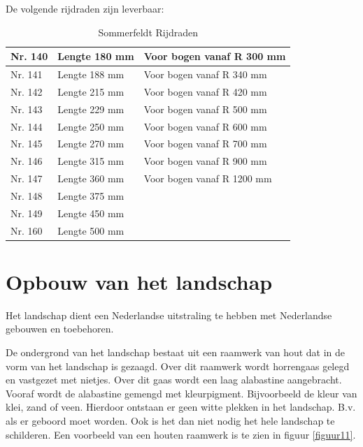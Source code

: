 \documentclass[12pt,a4paper]{report}
\begin{document}
De volgende rijdraden zijn leverbaar:

\begin{table}[h!]
\begin{tabular}{| l | l | l |}
\hline
\cellcolor[gray]{0.84}Nr. 140&Lengte 180 mm&Voor bogen vanaf R 300 mm\\
\hline
\cellcolor[gray]{0.84}Nr. 141&Lengte 188 mm&Voor bogen vanaf R 340 mm\\
\hline
\cellcolor[gray]{0.84}Nr. 142&Lengte 215 mm&Voor bogen vanaf R 420 mm\\
\hline
\cellcolor[gray]{0.84}Nr. 143&Lengte 229 mm&Voor bogen vanaf R 500 mm\\
\hline
\cellcolor[gray]{0.84}Nr. 144&Lengte 250 mm&Voor bogen vanaf R 600 mm\\
\hline
\cellcolor[gray]{0.84}Nr. 145&Lengte 270 mm&Voor bogen vanaf R 700 mm\\
\hline
\cellcolor[gray]{0.84}Nr. 146&Lengte 315 mm&Voor bogen vanaf R 900 mm\\
\hline
\cellcolor[gray]{0.84}Nr. 147&Lengte 360 mm&Voor bogen vanaf R 1200 mm\\
\hline
\cellcolor[gray]{0.84}Nr. 148&Lengte 375 mm&\\
\hline
\cellcolor[gray]{0.84}Nr. 149&Lengte 450 mm&\\
\hline
\cellcolor[gray]{0.84}Nr. 160&Lengte 500 mm&\\
\hline
\end{tabular}
\caption{Sommerfeldt Rijdraden}
\end{table}

\chapter{Opbouw van het landschap}
\label{ch:landschap}

Het landschap dient een Nederlandse uitstraling te hebben met Nederlandse gebouwen en toebehoren.

De ondergrond van het landschap bestaat uit een raamwerk van hout dat in de vorm van het landschap is gezaagd. Over dit raamwerk wordt horrengaas gelegd en vastgezet met nietjes. Over dit gaas wordt een laag alabastine aangebracht. Vooraf wordt de alabastine gemengd met kleurpigment. Bijvoorbeeld de kleur van klei, zand of veen. Hierdoor ontstaan er geen witte plekken in het landschap. B.v. als er geboord moet worden. Ook is het dan niet nodig het hele landschap te schilderen.
Een voorbeeld van een houten raamwerk is te zien in figuur \ref{figuur11}.
\end{document}
